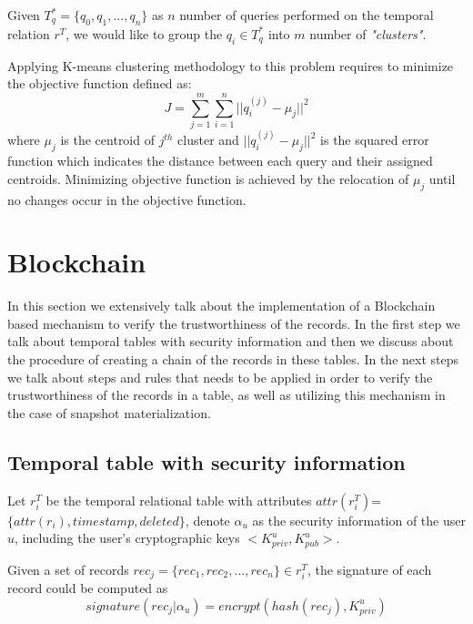 			\begin{prop} 
				Given $T_q^* = \{q_0,q_1,...,q_n\}$ as $n$ number of queries performed on the temporal relation $r^T$, we would like to group the $q_i \in T_q^*$ into $m$ number of \textit{"clusters"}. 
			\label{prop:heuristic_method}
			\end{prop}

			Applying K-means clustering methodology to this problem requires to minimize the objective function defined as:
			$$J = \sum_{j=1}^{m} \sum_{i=1}^{n} ||q_i^{(j)}-\mu_j||^2$$
			where $\mu_j$ is the centroid of $j^{th}$ cluster and $||q_i^{(j)}-\mu_j||^2$ is the squared error function which indicates the distance between each query and their assigned centroids.
			Minimizing objective function is achieved by the relocation of $\mu_j$ until no changes occur in the objective function.

	\section{Blockchain} \label{sec:blockchain}
		In this section we extensively talk about the implementation of a Blockchain based mechanism to verify the trustworthiness of the records. In the first step we talk about temporal tables with security information and then we discuss about the procedure of creating a chain of the records in these tables. In the next steps we talk about steps and rules that needs to be applied in order to verify the trustworthiness of the records in a table, as well as utilizing this mechanism in the case of snapshot materialization.

		\subsection{Temporal table with security information} \label{sec:temporal_with_security}
			Let $r_i^T$ be the temporal relational table with attributes $attr(r_i^T)$=$\{attr(r_i), timestamp,deleted\}$, denote $\alpha_u$ as the security information of the user $u$, including the user's cryptographic keys $<K_{priv}^u, K_{pub}^u>$.


			\begin{defn} 
				Given a set of records $rec_j =\{rec_1,rec_2,...,rec_n\} \in r_i^T$, the signature of each record could be computed as $$signature(rec_j|\alpha_u)= encrypt(hash(rec_j),K_{priv}^u)$$  
			\label{defn:digital_signature}
			\end{defn}

